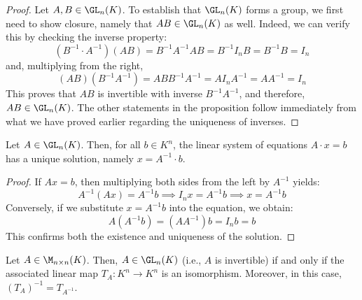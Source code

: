 \begin{proof}
Let $A, B \in \GL_n(K)$. To establish that $\GL_n(K)$ forms a group, we first need to show closure, namely that $AB \in \GL_n(K)$ as well. Indeed, we can verify this by checking the inverse property:
\begin{equation*}
    (B^{-1} \cdot A^{-1})(AB) = B^{-1}A^{-1}AB = B^{-1}I_nB = B^{-1}B = I_n
\end{equation*}
and, multiplying from the right,
\begin{equation*}
    (AB)(B^{-1}A^{-1}) = ABB^{-1}A^{-1} = AI_nA^{-1} = AA^{-1} = I_n
\end{equation*}
This proves that $AB$ is invertible with inverse $B^{-1}A^{-1}$, and therefore, $AB \in \GL_n(K)$. The other statements in the proposition follow immediately from what we have proved earlier regarding the uniqueness of inverses.
\end{proof}

\begin{corollary}
\label{cor:unique_solution_via_inverse}
Let $A \in \GL_n(K)$. Then, for all $b \in K^n$, the linear system of equations $A \cdot x = b$ has a unique solution, namely $x = A^{-1} \cdot b$.
\end{corollary}

\begin{proof}
If $Ax = b$, then multiplying both sides from the left by $A^{-1}$ yields:
\begin{equation*}
    A^{-1}(Ax) = A^{-1}b \implies I_n x = A^{-1}b \implies x = A^{-1}b
\end{equation*}
Conversely, if we substitute $x = A^{-1}b$ into the equation, we obtain:
\begin{equation*}
    A(A^{-1}b) = (AA^{-1})b = I_n b = b
\end{equation*}
This confirms both the existence and uniqueness of the solution.
\end{proof}

\begin{proposition}
\label{prop:invertibility_isomorphism_equivalence}
Let $A \in \M_{n \times n}(K)$. Then, $A \in \GL_n(K)$ (i.e., $A$ is invertible) if and only if the associated linear map $T_A: K^n \to K^n$ is an isomorphism. Moreover, in this case, $(T_A)^{-1} = T_{A^{-1}}$.
\end{proposition}

